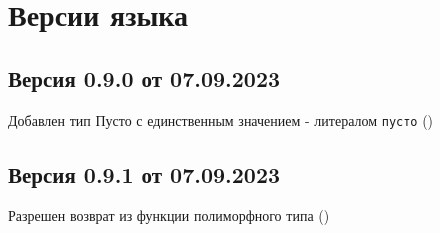 \hypertarget{versions}{%
\section{Версии языка}\label{versions:chapter}}

\hypertarget{v090}{%
\subsection{Версия 0.9.0 от 07.09.2023}\label{versions:v090}}

\begin{d_itemize}
\item Добавлен тип Пусто с единственным значением - литералом \verb+пусто+  ()
\end{d_itemize}

\hypertarget{v091}{%
\subsection{Версия 0.9.1 от 07.09.2023}\label{versions:v091}}

\begin{d_itemize}
\item Разрешен возврат из функции полиморфного типа  ()
\end{d_itemize}